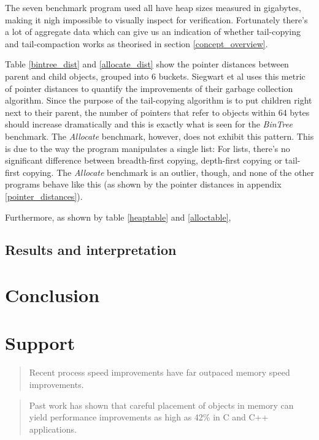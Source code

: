 \documentclass[a4paper,oneside]{memoir}
\begin{document}
The seven benchmark program used all have heap sizes measured in gigabytes,
making it nigh impossible to visually inspect for verification. Fortunately
there's a lot of aggregate data which can give us an indication of whether
tail-copying and tail-compaction works as theorised in section \ref{concept_overview}.

Table \ref{bintree_dist} and \ref{allocate_dist} show the pointer distances
between parent and child objects, grouped into 6 buckets. Siegwart et al uses
this metric of pointer distances to quantify the improvements of their
garbage collection algorithm.\cite{Siegwart:2006} Since the purpose of the tail-copying algorithm
is to put children right next to their parent, the number of pointers that refer
to objects within 64 bytes should increase dramatically and this is exactly what
is seen for the \emph{BinTree} benchmark. The \emph{Allocate} benchmark, however,
does not exhibit this pattern. This is due to the way the program manipulates
a single list: For lists, there's no significant difference between breadth-first
copying, depth-first copying or tail-first copying. The \emph{Allocate} benchmark
is an outlier, though, and none of the other programs behave like this (as
shown by the pointer distances in appendix \ref{pointer_distances}).

Furthermore, as shown by table \ref{heaptable} and \ref{alloctable},
\section{Results and interpretation}



\chapter{Conclusion}


\chapter*{Support}


\blockquote{Recent process speed improvements have far outpaced memory speed
improvements.}\cite{Novark:2006}

\blockquote{Past work has shown that careful placement of objects in memory can
yield performance improvements as high as 42\% in C and C++ applications.}
\cite{Novark:2006}
\end{document}
